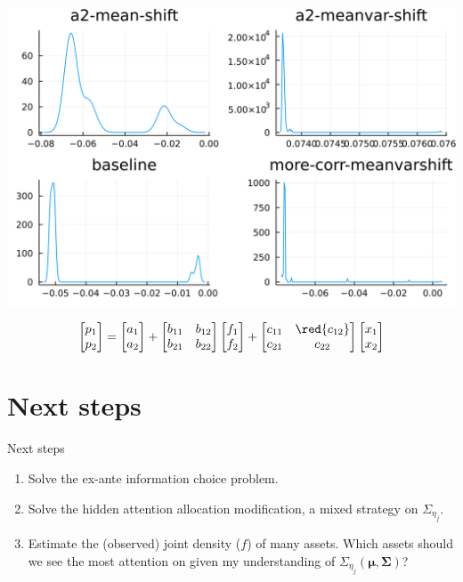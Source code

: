 \documentclass[
  ignorenonframetext,
]{beamer}
\providecommand{\tightlist}{%
  \setlength{\itemsep}{0pt}\setlength{\parskip}{0pt}}
\begin{document}
\begin{frame}{}
\protect\hypertarget{section-11}{}
\begin{center}\includegraphics[width=0.95\paperheight]{complexity_files/figure-beamer/unnamed-chunk-32-1} \end{center}

\[
\begin{bmatrix}
 p_1 \\ p_2
\end{bmatrix} =
\begin{bmatrix}
 a_1 \\ {a_2}
\end{bmatrix}
 + 
 \begin{bmatrix}
 {b_{11}} & b_{12} \\
 {b_{21}} & {b_{22}}
\end{bmatrix}
\begin{bmatrix}
 f_1 \\ f_2
\end{bmatrix}
+
 \begin{bmatrix}
 {c_{11}} & \red{c_{12}} \\
 c_{21} & {c_{22}}
\end{bmatrix} 
\begin{bmatrix}
 x_1 \\ x_2
\end{bmatrix}
\]
\end{frame}

\hypertarget{next-steps}{%
\section{Next steps}\label{next-steps}}

\begin{frame}{Next steps}
\protect\hypertarget{next-steps-1}{}
\begin{enumerate}
\tightlist
\item
  Solve the ex-ante information choice problem.
\item
  Solve the hidden attention allocation modification, a mixed strategy
  on \(\Sigma_{\eta_j}\).
\item
  Estimate the (observed) joint density (\(f\)) of many assets. Which
  assets should we see the most attention on given my understanding of
  \(\Sigma_{\eta_j}(\mathbf{\mu}, \mathbf{\Sigma})\)?
\end{enumerate}
\end{frame}
\end{document}

